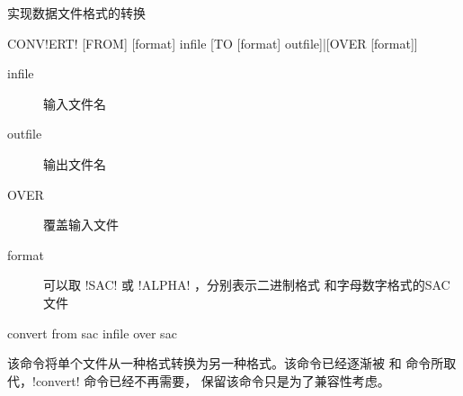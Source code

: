 \label{cmd:convert}

实现数据文件格式的转换

\begin{SACSTX}
CONV!ERT! [FROM] [format] infile [TO [format] outfile]|[OVER [format]]
\end{SACSTX}

\begin{description}
\item [infile] 输入文件名
\item [outfile] 输出文件名
\item [OVER] 覆盖输入文件
\item [format] 可以取 !SAC! 或 !ALPHA! ，分别表示二进制格式
    和字母数字格式的SAC文件
\end{description}

\begin{SACDFT}
convert from sac infile over sac
\end{SACDFT}

该命令将单个文件从一种格式转换为另一种格式。该命令已经逐渐被 
和  命令所取代，!convert! 命令已经不再需要，
保留该命令只是为了兼容性考虑。

